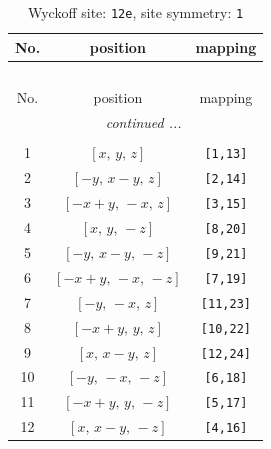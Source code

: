 \documentclass[fleqn,8pt]{jsarticle}
\begin{document}
\begin{longtable}{ccc}
\caption{Wyckoff site: {\tt 12e}, site symmetry: {\tt 1}}
 \\
 \hline \hline
No. & position & mapping \\ \hline \endfirsthead

\multicolumn{2}{l}{\tablename\ \thetable{}} \\
 \hline \hline
No. & position & mapping \\ \hline \endhead

 \hline \hline
\multicolumn{2}{r}{\footnotesize\it continued ...} \\ \endfoot

 \hline \hline
\multicolumn{2}{r}{} \\ \endlastfoot

1 & $\left[ x,\, y,\, z \right]$ & {\tt [1,13]} \\ \hline
2 & $\left[ - y,\, x - y,\, z \right]$ & {\tt [2,14]} \\ \hline
3 & $\left[ - x + y,\, - x,\, z \right]$ & {\tt [3,15]} \\ \hline
4 & $\left[ x,\, y,\, - z \right]$ & {\tt [8,20]} \\ \hline
5 & $\left[ - y,\, x - y,\, - z \right]$ & {\tt [9,21]} \\ \hline
6 & $\left[ - x + y,\, - x,\, - z \right]$ & {\tt [7,19]} \\ \hline
7 & $\left[ - y,\, - x,\, z \right]$ & {\tt [11,23]} \\ \hline
8 & $\left[ - x + y,\, y,\, z \right]$ & {\tt [10,22]} \\ \hline
9 & $\left[ x,\, x - y,\, z \right]$ & {\tt [12,24]} \\ \hline
10 & $\left[ - y,\, - x,\, - z \right]$ & {\tt [6,18]} \\ \hline
11 & $\left[ - x + y,\, y,\, - z \right]$ & {\tt [5,17]} \\ \hline
12 & $\left[ x,\, x - y,\, - z \right]$ & {\tt [4,16]} \\
\end{longtable}
\end{document}
